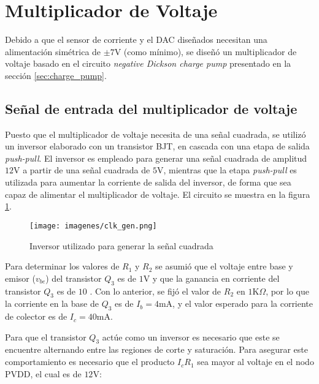 \section{Multiplicador de Voltaje}

    Debido a que el sensor de corriente y el DAC diseñados necesitan una
    alimentación simétrica de $\pm 7\text{V}$ (como mínimo), se diseñó 
    un multiplicador de voltaje basado en el circuito \textit{negative 
    Dickson charge pump} presentado en la sección \ref{sec:charge_pump}.

    \subsection{Señal de entrada del multiplicador de voltaje}
    
    Puesto que el multiplicador de voltaje necesita de una señal cuadrada, se utilizó un inversor
    elaborado con un transistor BJT, en cascada con una etapa de salida 
    \textit{push-pull}. El inversor es empleado para generar una señal
    cuadrada de amplitud $12\text{V}$ a partir de una señal cuadrada 
    de $5\text{V}$, mientras que la etapa \textit{push-pull}
    es utilizada para aumentar la corriente de salida del inversor, de forma
    que sea capaz de alimentar el multiplicador de voltaje. El circuito
    se muestra en la figura \ref{fig:inversor}.
    
    \begin{figure}[H]
        \centering
        \texttt{[image: imagenes/clk\_gen.png]}
        \caption{Inversor utilizado para generar la señal cuadrada}
        \label{fig:inversor}
    \end{figure}

    Para determinar los valores de $R_1$ y $R_2$
    se asumió que el voltaje entre base y emisor ($v_{be}$) del transistor $Q_3$
    es de $1\text{V}$  y que la ganancia en corriente del 
    transistor $Q_3$ es de $10$ \cite{mmtb5551}. Con lo anterior, se fijó el 
    valor de $R_2$ en $1\text{K}\Omega$, por 
    lo que la corriente en la base de $Q_3$ es de $I_b = 4\text{mA}$, y el valor
     esperado para la corriente de colector es de $I_c = 40\text{mA}$.

    Para que el transistor $Q_3$ actúe como un inversor es necesario que 
    este se encuentre alternando entre
    las regiones de corte y saturación. Para asegurar este comportamiento es necesario
    que el producto $I_cR_1$ sea mayor al voltaje en el nodo PVDD, el cual
    es de $12\text{V}$:
    

